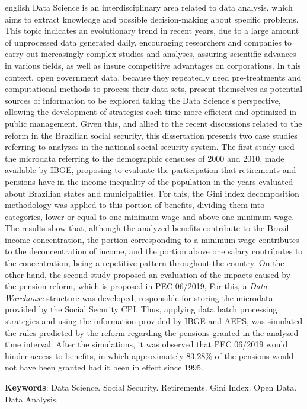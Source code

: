 \begin{resumo}[Abstract]
 \begin{otherlanguage*}{english}
 Data Science is an interdisciplinary area related to data analysis, which aims to extract knowledge and possible decision-making about specific problems. This topic indicates an evolutionary trend in recent years, due to a large amount of unprocessed data generated daily, encouraging researchers and companies to carry out increasingly complex studies and analyses, assuring scientific advances in various fields, as well as insure competitive advantages on corporations. In this context, open government data, because they repeatedly need pre-treatments and computational methods to process their data sets, present themselves as potential sources of information to be explored taking the Data Science's perspective, allowing the development of strategies each time more efficient and optimized in public management. Given this, and allied to the recent discussions related to the reform in the Brazilian social security, this dissertation presents two case studies referring to analyzes in the national social security system. The first study used the microdata referring to the demographic censuses of 2000 and 2010, made available by IBGE, proposing to evaluate the participation that retirements and pensions have in the income inequality of the population in the years evaluated about Brazilian states and municipalities. For this, the Gini index decomposition methodology was applied to this portion of benefits, dividing them into categories, lower or equal to one minimum wage and above one minimum wage. The results show that, although the analyzed benefits contribute to the Brazil income concentration, the portion corresponding to a minimum wage contributes to the deconcentration of income, and the portion above one salary contributes to the concentration, being a repetitive pattern throughout the country. On the other hand, the second study proposed an evaluation of the impacts caused by the pension reform, which is proposed in PEC 06/2019, For this, a \textit{Data Warehouse} structure was developed, responsible for storing the microdata provided by the Social Security CPI. Thus, applying data batch processing strategies and using the information provided by IBGE and AEPS, was simulated the rules predicted by the reform regarding the pensions granted in the analyzed time interval. After the simulations, it was observed that PEC 06/2019 would hinder access to benefits, in which approximately 83,28\% of the pensions would not have been granted had it been in effect since 1995.

\vspace{\onelineskip}
 
\noindent 
\textbf{Keywords}: Data Science. Social Security. Retirements. Gini Index. Open Data. Data Analysis.
\end{otherlanguage*}
\end{resumo}